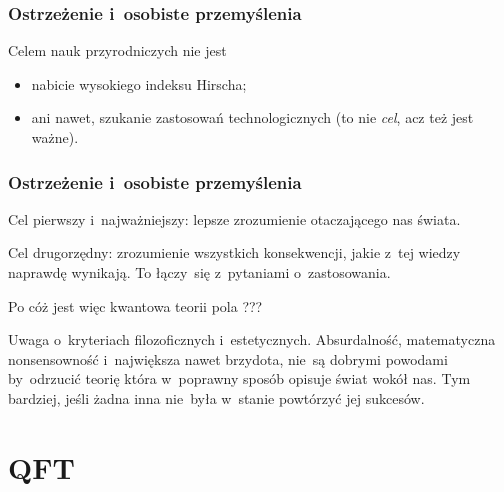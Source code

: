 \documentclass[10pt,t]{beamer}
\begin{document}
\begin{frame}
  \frametitle{Ostrzeżenie i~osobiste przemyślenia}


  Celem nauk przyrodniczych nie jest
  \begin{itemize}
    \RaggedRight

  \item nabicie wysokiego indeksu Hirscha;

  \item ani nawet, szukanie zastosowań technologicznych (to nie
    {\color{red} \textit{cel}}, acz też jest ważne).

  \end{itemize}

\end{frame}





\begin{frame}
  \frametitle{Ostrzeżenie i~osobiste przemyślenia}


  Cel pierwszy i~najważniejszy: lepsze zrozumienie otaczającego nas świata.

  Cel drugorzędny: zrozumienie wszystkich konsekwencji, jakie z~tej wiedzy
  naprawdę wynikają. To łączy~się z~pytaniami o~zastosowania.

  Po cóż jest więc kwantowa teorii pola{\LARGE \color{red} ???}

  Uwaga o~kryteriach filozoficznych i~estetycznych.
  Absurdalność, matematyczna nonsensowność i~największa nawet
  brzydota, nie~są dobrymi powodami by~odrzucić teorię która
  w~poprawny sposób opisuje świat wokół nas. Tym bardziej, jeśli żadna
  inna nie~była w~stanie powtórzyć jej sukcesów.

\end{frame}










\section{QFT}
\end{document}
